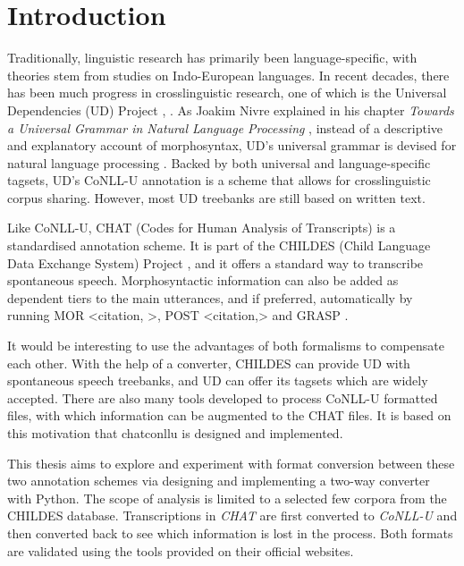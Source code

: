 \chapter{Introduction} %

\label{Chapter1} %

Traditionally, linguistic research has primarily been language-specific, with theories stem from studies on Indo-European languages. In recent decades, there has been much progress in crosslinguistic research, one of which is the Universal Dependencies (UD) Project \cite{nivre2016}, \cite{nivre2020}. As Joakim Nivre explained in his chapter \emph{Towards a Universal Grammar in Natural Language Processing} , instead of a descriptive and explanatory account of morphosyntax, UD's universal grammar is devised for natural language processing \cite{nivre2015}. Backed by both universal and language-specific tagsets, UD's CoNLL-U annotation is a scheme that allows for crosslinguistic corpus sharing. However, most UD treebanks are still based on written text.

Like CoNLL-U, CHAT (Codes for Human Analysis of Transcripts) \cite{Macwhinney2000} is a standardised annotation scheme. It is part of the CHILDES (Child Language Data Exchange System) Project \cite{Macwhinney2000}, and it offers a standard way to transcribe spontaneous speech. Morphosyntactic information can also be added as dependent tiers to the main utterances, and if preferred, automatically by running MOR <citation, >, POST <citation,> and GRASP \cite{Sagae2004}.

It would be interesting to use the advantages of both formalisms to compensate each other. With the help of a converter, CHILDES can provide UD with spontaneous speech treebanks, and UD can offer its tagsets which are widely accepted. There are also many tools developed to process CoNLL-U formatted files, with which information can be augmented to the CHAT files. It is based on this motivation that chatconllu is designed and implemented.

This thesis aims to explore and experiment with format conversion between these two annotation schemes via designing and implementing a two-way converter with Python. The scope of analysis is limited to a selected few corpora from the CHILDES database. Transcriptions in \emph{CHAT} are first converted to \emph{CoNLL-U} and then converted back to see which information is lost in the process. Both formats are validated using the tools provided on their official websites.

